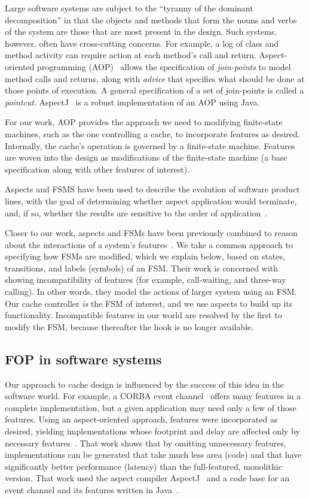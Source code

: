 \documentclass[conference]{IEEEtran}
\begin{document}
Large software systems are subject to the ``tyranny of the dominant decomposition'' in that the objects and methods that form the nouns and verbs of the system are those that are most present in the design.  Such systems, however, often have cross-cutting concerns.  For example, a log of class and method activity can require action at each method's call and return.  Aspect-oriented programming (AOP)~\cite{Kicz97} allows the specification of \emph{join-points} to model method calls and returns, along with \emph{advice} that specifies what should be done at those points of execution.  A general specification of a set of join-points is called a \emph{pointcut}. AspectJ~\cite{AspectJ:01} is a robust implementation of an AOP using Java.

For our work, AOP provides the approach we need to modifying finite-state machines, such as the one controlling a cache, to incorporate features as desired.  
Internally, the cache's operation is governed by a finite-state machine.  Features are woven into the design as modifications of the finite-state machine (a base specification along with other features of interest).

Aspects and FSMS have been used to describe the evolution of software product lines, with the goal of determining whether aspect application would terminate, and, if so, whether the results are sensitive to the order of application~\cite{aspectsUML}.

Closer to our work, aspects and FSMs have been previously combined to reason about the interactions of a system's features~\cite{6078174}.  We take a common approach to specifying how FSMs are modified, which we explain below, based on states, transitions, and labels (symbols) of an FSM.  Their work is concerned with showing incompatibility of features (for example, call-waiting, and three-way calling).  In other words, they model the actions of larger system using an FSM.  Our cache controller \emph{is} the FSM of interest, and we use aspects to build up its functionality.   Incompatible features in our world are resolved by the first to modify the FSM, because thereafter the hook is no longer available.

\subsection{FOP in software systems}
Our approach to cache design is influenced by the success of this idea in the software world.  For example, a CORBA event channel~\cite{corbaeventchannel} offers many features in a complete implementation, but a given application may need only a few of those features.  Using an aspect-oriented approach, features were incorporated as desired, yielding implementations whose footprint and delay are affected only by necessary features~\cite{ourwork}.  That work shows that by omitting unnecessary features, implementations can be generated that take much less area (code) and that have significantly better performance (latency) than the full-featured, monolithic version.  That work used the aspect compiler AspectJ~\cite{AspectJ:01} and a code base for an event channel and its features written in Java~\cite{Java}.
\end{document}
